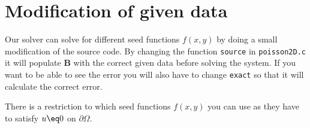 
\section{Modification of given data} %
\label{sec:modification_of_given_data}
Our solver can solve for different seed functions $f(x,y)$ by doing a small modification of the source code. By changing the function \texttt{source} in \texttt{poisson2D.c} it will populate \textbf{B} with the correct given data before solving the system. If you want to be able to see the error you will also have to change \texttt{exact} so that it will calculate the correct error. 

There is a restriction to which seed functions $f(x,y)$ you can use as they have to satisfy $u \eq 0$ on $\partial\Omega$.	
